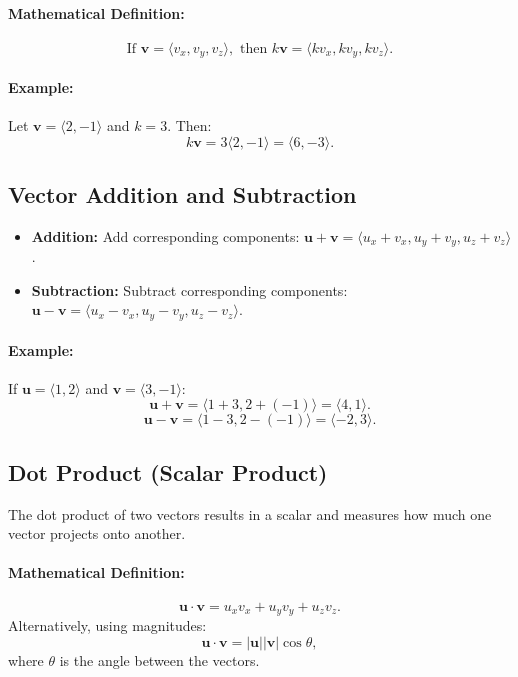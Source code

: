 \documentclass[12pt]{article}
\begin{document}
\paragraph{Mathematical Definition:}
\[
\text{If } \mathbf{v} = \langle v_x, v_y, v_z \rangle, \text{ then } k\mathbf{v} = \langle kv_x, kv_y, kv_z \rangle.
\]

\paragraph{Example:}
Let $\mathbf{v} = \langle 2, -1 \rangle$ and $k = 3$. Then:
\[
k\mathbf{v} = 3\langle 2, -1 \rangle = \langle 6, -3 \rangle.
\]

\subsection{Vector Addition and Subtraction}
\begin{itemize}
    \item \textbf{Addition:} Add corresponding components: $\mathbf{u} + \mathbf{v} = \langle u_x + v_x, u_y + v_y, u_z + v_z \rangle$.
    \item \textbf{Subtraction:} Subtract corresponding components: $\mathbf{u} - \mathbf{v} = \langle u_x - v_x, u_y - v_y, u_z - v_z \rangle$.
\end{itemize}

\paragraph{Example:}
If $\mathbf{u} = \langle 1, 2 \rangle$ and $\mathbf{v} = \langle 3, -1 \rangle$:
\[
\mathbf{u} + \mathbf{v} = \langle 1+3, 2+(-1) \rangle = \langle 4, 1 \rangle.
\]
\[
\mathbf{u} - \mathbf{v} = \langle 1-3, 2-(-1) \rangle = \langle -2, 3 \rangle.
\]

\subsection{Dot Product (Scalar Product)}
The dot product of two vectors results in a scalar and measures how much one vector projects onto another.

\paragraph{Mathematical Definition:}
\[
\mathbf{u} \cdot \mathbf{v} = u_xv_x + u_yv_y + u_zv_z.
\]
Alternatively, using magnitudes:
\[
\mathbf{u} \cdot \mathbf{v} = |\mathbf{u}| |\mathbf{v}| \cos \theta,
\]
where $\theta$ is the angle between the vectors.
\end{document}
